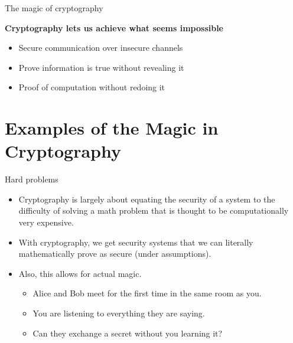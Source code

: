 \documentclass[aspectratio=169, lualatex, handout]{beamer}
\begin{document}
\begin{frame}[c]{The magic of cryptography}
	\begin{center}
		\Large\textbf{Cryptography lets us achieve what seems impossible}
		\vspace{1cm}
		\begin{itemize}[<+->]
			\item Secure communication over insecure channels
			\item Prove information is true without revealing it
			\item Proof of computation without redoing it
		\end{itemize}
	\end{center}
\end{frame}

\section{Examples of the Magic in Cryptography}

\begin{frame}{Hard problems}
	\begin{itemize}[<+->]
		\item Cryptography is largely about equating the security of a system to the
		      difficulty of solving a math problem that is thought to be computationally
		      very expensive.
		\item With cryptography, we get security systems that we can literally
		      mathematically prove as secure (under assumptions).
		\item Also, this allows for actual magic.
		      \begin{itemize}[<+->]
			      \item Alice and Bob meet for the first time in the same room as you.
			      \item You are listening to everything they are saying.
			      \item Can they exchange a secret without you learning it?
		      \end{itemize}
	\end{itemize}
\end{frame}
\end{document}
